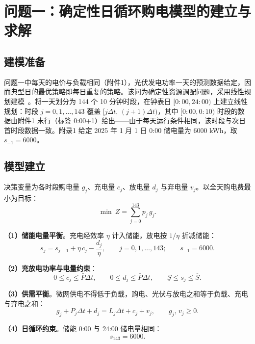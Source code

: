 \documentclass[zihao=-4,a4paper,UTF8,fontset=none]{ctexart}
\begin{document}
\section{问题一：确定性日循环购电模型的建立与求解}

\subsection{建模准备}

问题一中每天的电价与负载相同（附件1），光伏发电功率一天的预测数据给定，因而典型日的最优策略即每日重复的策略。该问为确定性资源调配问题，采用线性规划建模~\cite{jiang2003modeling}。将一天划分为 144 个 10 分钟时段，在钟表日 $[0{:}00,24{:}00)$ 上建立线性规划：时段 $j=0,1,\ldots,143$ 覆盖 $[j\Delta t,\,(j{+}1)\Delta t)$，其中 $[0{:}00,0{:}10)$ 时段的数据由附件1 末行（标签 0:00+1）给出——由于每天运行条件相同，该时段与次日首时段数据一致。附录1 给定 2025 年 1 月 1 日 0:00 储电量为 6000 kWh，取 $s_{-1}=6000$。

\subsection{模型建立}

决策变量为各时段购电量 $g_j$、充电量 $c_j$、放电量 $d_j$ 与弃电量 $v_j$。以全天购电费最小为目标：
\begin{equation}
  \min\ Z=\sum_{j=0}^{143} p_j\, g_j .
  \label{eq:q1obj}
\end{equation}

\textbf{（1）储能电量平衡}。充电经效率 $\eta$ 计入储能，放电按 $1/\eta$ 折减储能：
\begin{equation}
  s_j = s_{j-1} + \eta\, c_j - \frac{d_j}{\eta},\qquad j=0,1,\ldots,143;\qquad s_{-1}=6000 .
  \label{eq:q1soc}
\end{equation}

\textbf{（2）充放电功率与电量约束}：
\begin{equation}
  0\le c_j\le \bar P\Delta t,\qquad 0\le d_j\le \bar P\Delta t,\qquad
  \underline S\le s_j\le \overline S .
  \label{eq:q1power}
\end{equation}

\textbf{（3）供需平衡}。微网供电不得低于负载，购电、光伏与放电之和等于负载、充电与弃电之和：
\begin{equation}
  g_j + P_j\Delta t + d_j = L_j\Delta t + c_j + v_j,\qquad g_j,\,v_j\ge 0 .
  \label{eq:q1balance}
\end{equation}

\textbf{（4）日循环约束}。储能 0:00 与 24:00 储电量相同：
\begin{equation}
  s_{143} = 6000 .
  \label{eq:q1cycle}
\end{equation}
\end{document}
